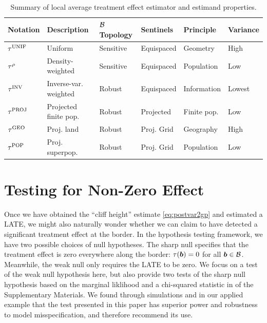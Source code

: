 \begin{table}[tbp]
    \centering
    \bgroup
    \def\arraystretch{1.1}%
    \begin{tabular}{llllll}
        \hline
        Notation   & Description           & \(\mathcal{B}\) Topology & Sentinels & Principle & Variance \\
        \hline
        \(\tau^{\mathrm{UNIF}}\) & Uniform               & Sensitive & Equispaced      & Geometry    & High     \\
        \(\tau^{\rho}\)  & Density-weighted      & Sensitive & Equispaced      & Population  & Low      \\
        \(\tau^{\mathrm{INV}}\)  & Inverse-var. weighted & Robust    & Equispaced      & Information & Lowest   \\
        \(\tau^{\mathrm{PROJ}}\) & Projected finite pop. & Robust    & Projected       & Finite pop. & Low      \\
        \(\tau^{\mathrm{GEO}}\)  & Proj. land            & Robust    & Proj. Grid  & Geography   & High     \\
        \(\tau^{\mathrm{POP}}\)  & Proj. superpop.       & Robust    & Proj. Grid  & Population  & Low \\
        \hline
    \end{tabular}
    \egroup
    \caption{
    \label{table:estimator_properties}
    Summary of local average treatment effect estimator and estimand properties.}
\end{table}

\section{Testing for Non-Zero Effect}
\label{sec:hypothesis_testing}
Once we have obtained the ``cliff height'' estimate \autoref{eq:postvar2gp} and estimated a LATE, we might also naturally wonder whether we can claim to have detected a significant treatment effect at the border.
In the hypothesis testing framework, we have two possible choices of null hypotheses.
The sharp null specifies that the treatment effect is zero everywhere along the border:
\(\tau(\bm{b})=0\) for all \(\bm{b} \in \mathcal{B}\).
Meanwhile, the weak null only requires the LATE to be zero.
We focus on a test of the weak null hypothesis here, but also provide two tests of the sharp null hypothesis based on the marginal liklihood and a chi-squared statistic in  of the Supplementary Materials.
We found through simulations and in our applied example that the test presented in this paper has superior power and robustness to model misspecification, and therefore recommend its use.

